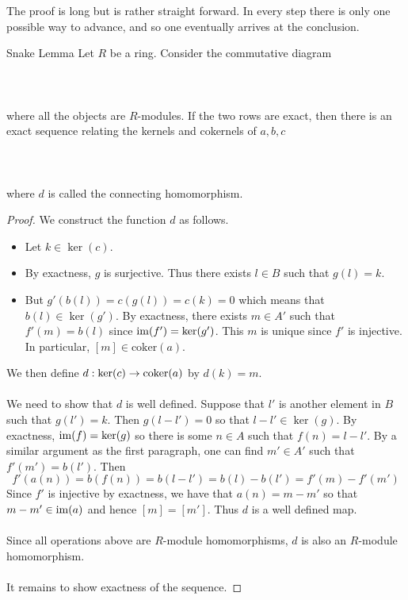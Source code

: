 \documentclass[a4paper]{article}
\begin{document}
The proof is long but is rather straight forward. In every step there is only one possible way to advance, and so one eventually arrives at the conclusion. 

\begin{lmm}{Snake Lemma}{} Let $R$ be a ring. Consider the commutative diagram \\~\\
\\~\\
where all the objects are $R$-modules. If the two rows are exact, then there is an exact sequence relating the kernels and cokernels of $a,b,c$ \\~\\
\\~\\
where $d$ is called the connecting homomorphism. \tcbline
\begin{proof}
We construct the function $d$ as follows. 
\begin{itemize}
\item Let $k\in\ker(c)$. 
\item By exactness, $g$ is surjective. Thus there exists $l\in B$ such that $g(l)=k$. 
\item But $g'(b(l))=c(g(l))=c(k)=0$ which means that $b(l)\in\ker(g')$. By exactness, there exists $m\in A'$ such that $f'(m)=b(l)$ since $\operatorname{im}(f')=\ker(g')$. This $m$ is unique since $f'$ is injective. In particular, $[m]\in\text{coker}(a)$. 
\end{itemize}
We then define $d:\ker(c)\to\operatorname{coker}(a)$ by $d(k)=m$. \\~\\

We need to show that $d$ is well defined. Suppose that $l'$ is another element in $B$ such that $g(l')=k$. Then $g(l-l')=0$ so that $l-l'\in\ker(g)$. By exactness, $\operatorname{im}(f)=\ker(g)$ so there is some $n\in A$ such that $f(n)=l-l'$. By a similar argument as the first paragraph, one can find $m'\in A'$ such that $f'(m')=b(l')$. Then $$f'(a(n))=b(f(n))=b(l-l')=b(l)-b(l')=f'(m)-f'(m')$$ Since $f'$ is injective by exactness, we have that $a(n)=m-m'$ so that $m-m'\in\operatorname{im}(a)$ and hence $[m]=[m']$. Thus $d$ is a well defined map. \\~\\

Since all operations above are $R$-module homomorphisms, $d$ is also an $R$-module homomorphism. \\~\\

It remains to show exactness of the sequence. 
\end{proof}
\end{lmm}
\end{document}
